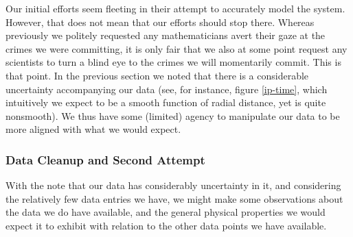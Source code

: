 Our initial efforts seem fleeting in their attempt to accurately model the system. However, that does not mean that 
our efforts should stop there. Whereas previously we politely 
requested any mathematicians avert their gaze at the crimes we were committing, it is only 
fair that we also at some point request any scientists to turn a blind eye to the 
crimes we will momentarily commit. This is that point. 
In the previous section we noted that there is a considerable uncertainty accompanying our data
(see, for instance, figure \ref{ip-time}, which intuitively we expect to be a smooth function of radial distance, 
yet is quite nonsmooth). We thus have some (limited) agency to manipulate our data to be more aligned 
with what we would expect.


\subsubsection{Data Cleanup and Second Attempt}
With the note that our data has considerably uncertainty in it, and considering the 
relatively few data entries we have, we might make some observations about the data 
we do have available, and the general physical properties we would expect it to exhibit 
with relation to the other data points we have available.


